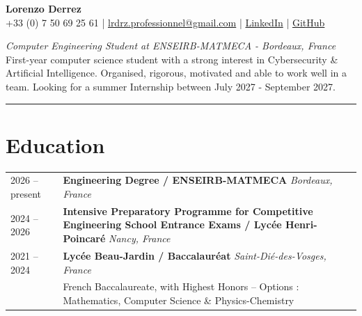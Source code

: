 \documentclass[11pt, a4paper]{article}
\begin{document}
\noindent





\hfill
\begin{minipage}[c]{0.75\textwidth}
\centering
{\LARGE \textbf{Lorenzo Derrez}}\\
+33 (0) 7 50 69 25 61 | \href{mailto:lrdrz.professionnel@gmail.com}{lrdrz.professionnel@gmail.com} | \href{https://www.linkedin.com/in/lorenzo-derrez}{LinkedIn} | \href{https://github.com/Nmrodd}{GitHub}
\end{minipage}
\hfill
\begin{minipage}[c]{1cm}
\end{minipage}

\begin{flushleft} %
    \large \textit{Computer Engineering Student at ENSEIRB-MATMECA - Bordeaux, France}
    \\[0.3em]
    First-year computer science student with a strong interest in Cybersecurity \& Artificial Intelligence. Organised, rigorous, motivated and able to work well in a team. Looking for a summer Internship  between July 2027 - September 2027.
\end{flushleft}

\rule{\textwidth}{0.4pt}  %

\section*{Education} %

\begin{tabularx}{\textwidth}{@{}l X r@{}}
    2026 -- present & \textbf{Engineering Degree / ENSEIRB-MATMECA} \quad \textit{Bordeaux, France}
    \\
    2024 -- 2026 & \textbf{Intensive Preparatory Programme for Competitive Engineering School Entrance Exams / Lycée Henri-Poincaré} \quad \textit{Nancy, France}
    \\
    2021 --  2024 & \textbf{Lycée Beau-Jardin / Baccalauréat} \quad \textit{Saint-Dié-des-Vosges, France}
    \\
    & \small French Baccalaureate, with Highest Honors -- Options : Mathematics, Computer Science \& Physics-Chemistry & \\[4pt]
\end{tabularx}
\end{document}
